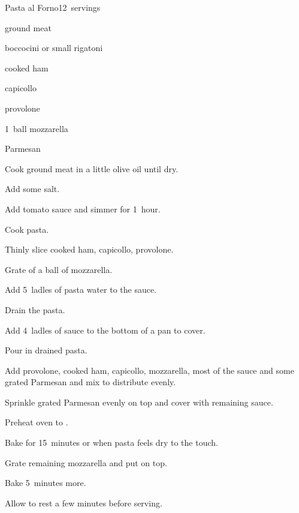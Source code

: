 \begin{recipe}{Pasta al Forno}{}{12~servings}

\begin{ingredients}
\item \lbs{1\half} ground meat
\item {} 
\item {} boccocini or small rigatoni
\item {} cooked ham
\item {} capicollo
\item {} provolone
\item 1~ball mozzarella
\item Parmesan
\end{ingredients}

\begin{directions}
\item Cook ground meat in a little olive oil until dry.
\item Add some salt.
\item Add tomato sauce and simmer for 1~hour.
\item Cook pasta.
\item Thinly slice cooked ham, capicollo, provolone.
\item Grate \threequarter{} of a ball of mozzarella.
\item Add 5~ladles of pasta water to the sauce.
\item Drain the pasta.
\item Add 4~ladles of sauce to the bottom of a pan to cover.
\item Pour in drained pasta.
\item Add provolone, cooked ham, capicollo, mozzarella, most of the sauce and some grated Parmesan and mix to distribute evenly.
\item Sprinkle grated Parmesan evenly on top and cover with remaining sauce.
\item Preheat oven to .
\item Bake for 15~minutes or when pasta feels dry to the touch.
\item Grate remaining mozzarella and put on top.
\item Bake 5~minutes more.
\item Allow to rest a few minutes before serving.
\end{directions}

\end{recipe}
